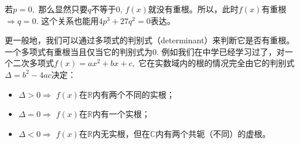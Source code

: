 若$p = 0,$ 那么显然只要$q$不等于0, $f(x)$就没有重根。所以，此时$f(x)$有重根$\Rightarrow q = 0.$ 这个关系也能用$4p^3 + 27q^2 = 0$表达。

\vspace{0.5em}

更一般地，我们可以通过多项式的判别式（determinant）来判断它是否有重根。一个多项式有重根当且仅当它的判别式为0. 例如我们在中学已经学习过了，对一个二次多项式$f(x) = ax^2 + bx + c,$ 它在实数域内的根的情况完全由它的判别式$\Delta = b^2 - 4ac$决定：
\begin{itemize}
\item $\Delta > 0 \Rightarrow$ $f(x)$在$\mathbb{R}$内有两个不同的实根；
\item $\Delta = 0 \Rightarrow$ $f(x)$在$\mathbb{R}$内有一个实根；
\item $\Delta < 0 \Rightarrow$ $f(x)$在$\mathbb{R}$内无实根，但在$\mathbb{C}$内有两个共轭（不同）的虚根。
\end{itemize}

